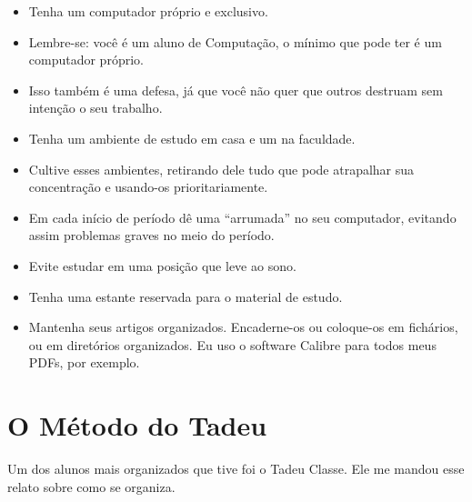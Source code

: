 \begin{itemize}
\item	Tenha um computador próprio e exclusivo. 


\item	Lembre-se: você é um aluno de Computação, o mínimo que pode ter é um computador próprio.


\item	Isso também é uma defesa, já que você não quer que outros destruam sem intenção o seu trabalho.


\item	Tenha um ambiente de estudo em casa e um na faculdade. 


\item	Cultive esses ambientes, retirando dele tudo que pode atrapalhar sua concentração e usando-os prioritariamente. 


\item	Em cada início de período dê uma “arrumada” no seu computador, evitando assim problemas graves no meio do período. 


\item	Evite estudar em uma posição que leve ao sono. 


\item	Tenha uma estante reservada para o material de estudo. 


\item	Mantenha seus artigos organizados. Encaderne-os ou coloque-os em fichários, ou em diretórios organizados. Eu uso o software Calibre para todos meus PDFs, por exemplo.
\end{itemize}

\section{O Método do Tadeu}


Um dos alunos mais organizados que tive foi o Tadeu Classe. Ele me mandou esse relato sobre como se organiza.

